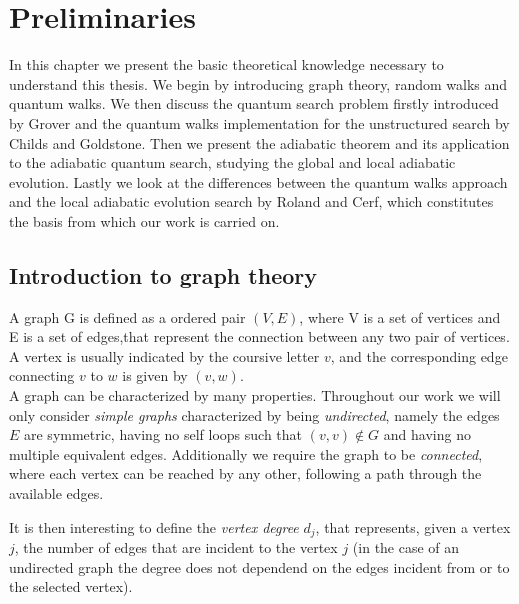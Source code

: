 \newcommand{\wvec}{\begin{pmatrix}1 \\ 0 \end{pmatrix}}
\newcommand{\svec}{{\begin{pmatrix}0 \\ 1 \end{pmatrix}}}
\newcommand{\kalpha}{\ket{\alpha}}
\newcommand{\kbeta}{\ket{\beta}}
\newcommand{\kpsi}{\ket{\psi}}




\newpage
\thispagestyle{empty}
\chapter{Preliminaries}\label{chapter one}
In this chapter we present the basic theoretical knowledge necessary to understand this thesis. We begin by introducing graph theory, random walks and quantum walks. We then discuss the quantum search problem firstly introduced by Grover and the quantum walks implementation for the unstructured search by Childs and Goldstone. Then we present the adiabatic theorem and its application to the adiabatic quantum search, studying the global and local adiabatic evolution. Lastly we look at the differences between the quantum walks approach and the local adiabatic evolution search by Roland and Cerf, which constitutes the basis from which our work is carried on.

\section{Introduction to graph theory}\label{sec:introduction to graph theory}
A graph G is defined as a ordered pair $(V,E)$, where V is a set of vertices and E is a set of edges,that represent the connection between any two pair of vertices. A vertex is usually indicated by the coursive letter $v$, and the corresponding edge connecting $v$ to $w$ is given by $(v,w)$. \\

\noindent
A graph can be characterized by many properties. Throughout our work we will only consider \textit{simple graphs} characterized by being \textit{undirected}, namely the edges $E$ are symmetric, having no self loops such that $(v,v)\notin G$ and having no multiple equivalent edges. Additionally we require the graph to be \textit{connected}, where each vertex can be reached by any other, following a path through the available edges.

\noindent
It is then interesting to define the \textit{vertex degree} $d_j$, that represents, given a vertex $j$, the number of edges that are incident to the vertex $j$ (in the case of an undirected graph the degree does not dependend on the edges incident from or to the selected vertex). \\

